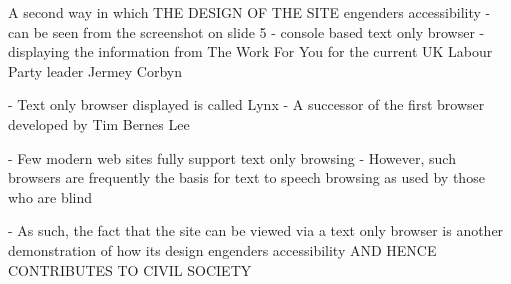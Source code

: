 A second way in which THE DESIGN OF THE SITE  engenders accessibility
	- can be seen from the screenshot on slide 5
	- console based text only browser
	- displaying the information from The Work For You for the current UK Labour Party leader Jermey Corbyn

	- Text only browser displayed is called Lynx
	- A successor of the first browser developed by Tim Bernes Lee
	
	- Few modern web sites fully support text only browsing
	- However, such browsers are frequently the basis for text to speech browsing as used by those who are blind
	
	- As such, the fact that the site can be viewed via a text only browser is another demonstration of how its design engenders accessibility
	AND HENCE CONTRIBUTES TO CIVIL SOCIETY